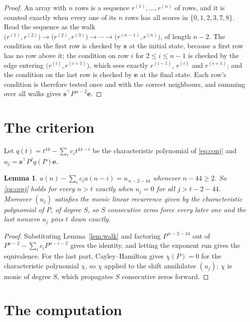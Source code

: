 \documentclass[11pt,a4paper]{article}
\theoremstyle{plain}
\newtheorem{lemma}[theorem]{Lemma}
\theoremstyle{definition}
\begin{document}
\begin{proof}
An array with $n$ rows is a sequence $r^{(1)},\dots,r^{(n)}$ of rows, and it is counted
exactly when every one of its $n$ rows has all scores in $\{0,1,2,3,7,8\}$. Read the sequence as the
walk $\bigl(r^{(1)},r^{(2)}\bigr)\to\bigl(r^{(2)},r^{(3)}\bigr)\to\cdots\to
\bigl(r^{(n-1)},r^{(n)}\bigr)$, of length $n-2$. The condition on the first row is
checked by $\mathbf{s}$ at the initial state, because a first row has no row above it; the
condition on row $i$ for $2\le i\le n-1$ is checked by the edge entering
$\bigl(r^{(i)},r^{(i+1)}\bigr)$, which sees exactly $r^{(i-1)}$, $r^{(i)}$ and
$r^{(i+1)}$; and the condition on the last row is checked by $\mathbf{e}$ at the final
state. Each row's condition is therefore tested once and with the correct neighbours, and
summing over all walks gives $\mathbf{s}^{\!\top}P^{\,n-2}\mathbf{e}$.
\end{proof}

\section{The criterion}

Let $q(t)=t^{44}-\sum_i c_i t^{44-i}$ be the characteristic polynomial of
\eqref{eq:conj} and $u_j=\mathbf{s}^{\!\top}P^{j}q(P)\mathbf{e}$.

\begin{lemma}\label{lem:crit}
$a(n)-\sum_i c_i a(n-i)=u_{\,n-2-44}$ whenever $n-44\ge2$. So \eqref{eq:conj}
holds for every $n>t$ exactly when $u_j=0$ for all $j>t-2-44$. Moreover $(u_j)$
satisfies the monic linear recurrence given by the characteristic polynomial of $P$, of
degree $S$, so $S$ consecutive zeros force every later one and the last nonzero $u_j$ pins
$t$ down exactly.
\end{lemma}

\begin{proof}
Substituting Lemma~\ref{lem:walk} and factoring $P^{\,n-2-44}$ out of
$P^{n-2}-\sum_i c_i P^{n-i-2}$ gives the identity, and letting the exponent run gives the
equivalence. For the last part, Cayley--Hamilton gives $\chi(P)=0$ for the characteristic
polynomial $\chi$, so $\chi$ applied to the shift annihilates $(u_j)$; $\chi$ is monic of
degree $S$, which propagates $S$ consecutive zeros forward.
\end{proof}

\section{The computation}
\end{document}
